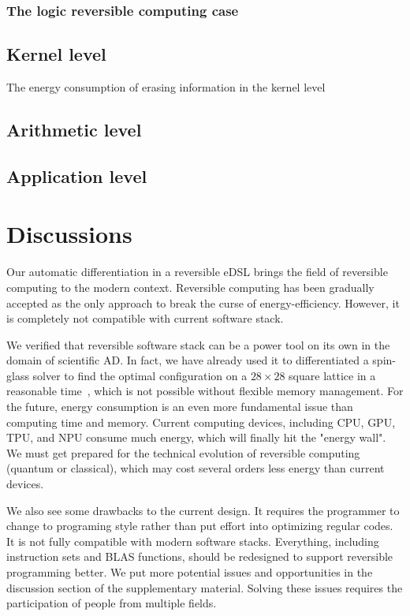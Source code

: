 \subsubsection{The logic reversible computing case}

\subsection{Kernel level}
The energy consumption of erasing information in the kernel level

\subsection{Arithmetic level}

\subsection{Application level}

\section*{Discussions}
Our automatic differentiation in a reversible eDSL brings the field of reversible computing to the modern context.
Reversible computing has been gradually accepted as the only approach to break the curse of energy-efficiency.
However, it is completely not compatible with current software stack.

We verified that reversible software stack can be a power tool on its own in the domain of scientific AD.
In fact, we have already used it to differentiated a spin-glass solver to find the optimal configuration on a $28\times 28$ square lattice in a reasonable time~\cite{Liu2020}, which is not possible without flexible memory management.
For the future, energy consumption is an even more fundamental issue than computing time and memory. Current computing devices, including CPU, GPU, TPU, and NPU consume much energy, which will finally hit the "energy wall". We must get prepared for the technical evolution of reversible computing (quantum or classical), which may cost several orders less energy than current devices.

We also see some drawbacks to the current design. It requires the programmer to change to programing style rather than put effort into optimizing regular codes. It is not fully compatible with modern software stacks. Everything, including instruction sets and BLAS functions, should be redesigned to support reversible programming better. We put more potential issues and opportunities in the discussion section of the supplementary material. Solving these issues requires the participation of people from multiple fields.

